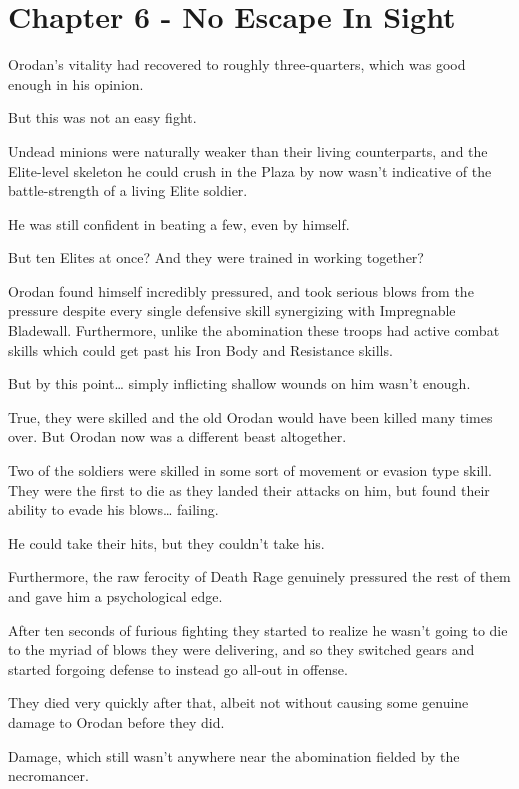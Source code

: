 \documentclass[a4paper,10pt]{book}
\begin{document}
\section*{Chapter 6 - No Escape In Sight}
%
\par
Orodan’s vitality had recovered to roughly three-quarters, which was good enough in his opinion.\par
But this was not an easy fight.\par
Undead minions were naturally weaker than their living counterparts, and the Elite-level skeleton he could crush in the Plaza by now wasn’t indicative of the battle-strength of a living Elite soldier.\par
He was still confident in beating a few, even by himself.\par
But ten Elites at once? And they were trained in working together?\par
Orodan found himself incredibly pressured, and took serious blows from the pressure despite every single defensive skill synergizing with Impregnable Bladewall. Furthermore, unlike the abomination these troops had active combat skills which could get past his Iron Body and Resistance skills.\par
But by this point… simply inflicting shallow wounds on him wasn’t enough.\par
True, they were skilled and the old Orodan would have been killed many times over. But Orodan now was a different beast altogether.\par
Two of the soldiers were skilled in some sort of movement or evasion type skill. They were the first to die as they landed their attacks on him, but found their ability to evade his blows… failing.\par
He could take their hits, but they couldn’t take his.\par
Furthermore, the raw ferocity of Death Rage genuinely pressured the rest of them and gave him a psychological edge.\par
After ten seconds of furious fighting they started to realize he wasn’t going to die to the myriad of blows they were delivering, and so they switched gears and started forgoing defense to instead go all-out in offense.\par
They died very quickly after that, albeit not without causing some genuine damage to Orodan before they did.\par
Damage, which still wasn’t anywhere near the abomination fielded by the necromancer.\par
\end{document}
